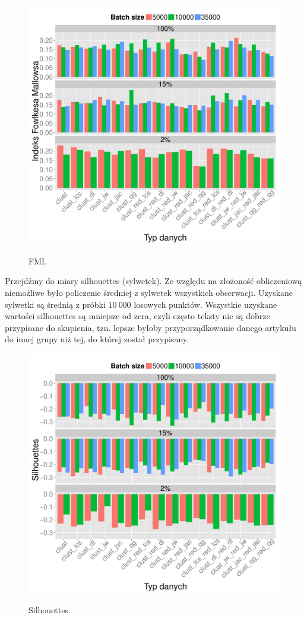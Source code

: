 \documentclass{praca1}
\begin{document}
\begin{figure}[!h]
  \centering
  \includegraphics[width=400pt]{plot15.pdf}\\
  \caption{FMI.}\label{plot:010}
\end{figure}

Przejdźmy do miary silhouettes (sylwetek). Ze względu na złożoność obliczeniową niemożliwe było policzenie średniej z sylwetek wszystkich obserwacji. Uzyskane sylwetki są średnią z próbki $10\ 000$ losowych punktów. Wszystkie uzyskane wartości silhouettes są mniejsze od zera, czyli często teksty nie są dobrze przypisane do skupienia, tzn. lepsze byłoby przyporządkowanie danego artykułu do innej grupy niż tej, do której został przypisany.

\begin{figure}[!h]
  \centering
  \includegraphics[width=400pt]{plot14.pdf}\\
  \caption{Silhouettes.}\label{plot:009}
\end{figure}
\end{document}
